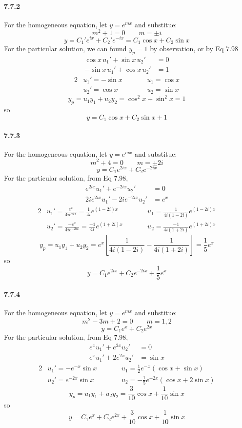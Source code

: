 \documentclass[a4paper]{article}
\begin{document}
\paragraph{7.7.2}
For the homogeneous equation, let $y=e^{mx}$ and substitue:
\[
m^2+1=0\qquad m=\pm i
\]
\[
y=C_1'e^{ix}+C_2'e^{-ix}=C_1\cos x+C_2\sin x
\]
For the particular solution, we can found $y_p=1$ by observation, or by Eq 7.98
\begin{align*}
     \cos x\,u_1'+\sin x\,u_2'&=0\\
     -\sin x\,u_1'+\cos x\,u_2'&=1
\end{align*}
\begin{alignat*}{2}
    & u_1'=-\sin x\qquad && u_1=\cos x\\
    & u_2'=\cos x\qquad && u_2=\sin x
\end{alignat*}
\[
y_p=u_1y_1+u_2y_2=\cos^2x+\sin^2x=1
\]
so
\[
y=C_1\cos x+C_2\sin x+1
\]

\paragraph{7.7.3}
For the homogeneous equation, let $y=e^{mx}$ and substitue:
\[
m^2+4=0\qquad m=\pm 2i
\]
\[
y=C_1e^{2ix}+C_2e^{-2ix}
\]
For the particular solution, from Eq 7.98,
\begin{align*}
    e^{2ix}u_1'+e^{-2ix}u_2'&=0\\
    2ie^{2ix}u_1'-2ie^{-2ix}u_2'&=e^x
\end{align*}
\begin{alignat*}{2}
    & u_1'=\frac{e^x}{4ie^{2ix}}=\frac{1}{4i}e^{(1-2i)x}\qquad && u_1=\frac{1}{4i(1-2i)}e^{(1-2i)x}\\
    & u_2'=\frac{-e^x}{4ie^{-2ix}}=\frac{-1}{4i}e^{(1+2i)x}\qquad && u_2=\frac{-1}{4i(1+2i)}e^{(1+2i)x}
\end{alignat*}
\[
y_p=u_1y_1+u_2y_2=e^x\left[\frac{1}{4i(1-2i)}-\frac{1}{4i(1+2i)}\right]=\frac{1}{5}e^x
\]
so
\[
y=C_1e^{2ix}+C_2e^{-2ix}+\frac{1}{5}e^x
\]

\paragraph{7.7.4}
For the homogeneous equation, let $y=e^{mx}$ and substitue:
\[
m^2-3m+2=0\qquad m=1,2
\]
\[
y=C_1e^x+C_2e^{2x}
\]
For the particular solution, from Eq 7.98,
\begin{align*}
    e^xu_1'+e^{2x}u_2'&=0\\
    e^xu_1'+2e^{2x}u_2'&=\sin x
\end{align*}
\begin{alignat*}{2}
    & u_1'=-e^{-x}\sin x\qquad && u_1=\frac{1}{2}e^{-x}(\cos x+\sin x)\\
    & u_2'=e^{-2x}\sin x\qquad && u_2=-\frac{1}{5}e^{-2x}(\cos x+2\sin x)
\end{alignat*}
\[
y_p=u_1y_1+u_2y_2=\frac{3}{10}\cos x+\frac{1}{10}\sin x
\]
so
\[
y=C_1e^x+C_2e^{2x}+\frac{3}{10}\cos x+\frac{1}{10}\sin x
\]
\end{document}
